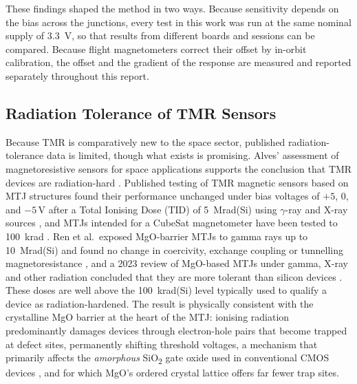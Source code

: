 \documentclass[12pt,a4paper]{article}
\begin{document}
These findings shaped the method in two ways. Because sensitivity depends on the bias across the junctions, every test in this work was run at the same nominal supply of \SI{3.3}{\volt}, so that results from different boards and sessions can be compared. Because flight magnetometers correct their offset by in-orbit calibration, the offset and the gradient of the response are measured and reported separately throughout this report.

\subsection{Radiation Tolerance of TMR Sensors}
\label{sec:rad-tolerance-lit}

Because TMR is comparatively new to the space sector, published radiation-tolerance data is limited, though what exists is promising. Alves' assessment of magnetoresistive sensors for space applications supports the conclusion that TMR devices are radiation-hard \cite{alves-thesis}. Published testing of TMR magnetic sensors based on MTJ structures found their performance unchanged under bias voltages of $+5$, $0$, and $-5\,\text{V}$ after a Total Ionising Dose (TID) of \SI{5}{\mega rad}(Si) using $\gamma$-ray and X-ray sources \cite{tmr-bias-radiation}, and MTJs intended for a CubeSat magnetometer have been tested to \SI{100}{\kilo rad} \cite{nguyen2010}. Ren et al.\ exposed MgO-barrier MTJs to gamma rays up to \SI{10}{\mega rad}(Si) and found no change in coercivity, exchange coupling or tunnelling magnetoresistance \cite{ren2012}, and a 2023 review of MgO-based MTJs under gamma, X-ray and other radiation concluded that they are more tolerant than silicon devices \cite{seifu2023}. These doses are well above the \SI{100}{\kilo rad}(Si) level typically used to qualify a device as radiation-hardened. The result is physically consistent with the crystalline MgO barrier at the heart of the MTJ: ionising radiation predominantly damages devices through electron-hole pairs that become trapped at defect sites, permanently shifting threshold voltages, a mechanism that primarily affects the \emph{amorphous} SiO\textsubscript{2} gate oxide used in conventional CMOS devices \cite{tid-basics-lanl}, and for which MgO's ordered crystal lattice offers far fewer trap sites.
\end{document}
